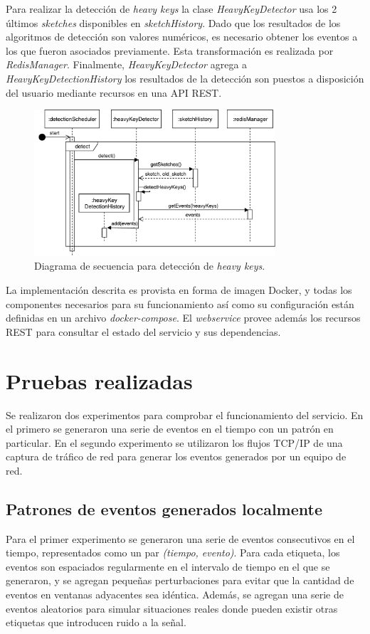 \documentclass[a4paper,10pt, oneside]{article}
\begin{document}
Para realizar la detección de \textit{heavy keys} la clase \textit{HeavyKeyDetector} usa los 2 últimos \textit{sketches} disponibles en \textit{sketchHistory}. Dado que los resultados de los algoritmos de detección son valores numéricos, es necesario obtener los eventos a los que fueron asociados previamente. Esta transformación es realizada por \textit{RedisManager}. Finalmente, \textit{HeavyKeyDetector} agrega a \textit{HeavyKeyDetectionHistory} los resultados de la detección son puestos a disposición del usuario mediante recursos en una API REST.

\begin{figure}[htbp]
	\centering
	\includegraphics[width=0.8\textwidth]{graph/SecDiag-detectionSchedulerDetect.pdf}
	\caption{Diagrama de secuencia para detección de \textit{heavy keys}.}
	\label{fig:SecDiagDetectionSchedulerDetect}
\end{figure}

La implementación descrita es provista en forma de imagen Docker, y todas los componentes necesarios para su funcionamiento así como su configuración están definidas en un archivo \textit{docker-compose}. El \textit{webservice} provee además los recursos REST para consultar el estado del servicio y sus dependencias.

\section{Pruebas realizadas}

Se realizaron dos experimentos para comprobar el funcionamiento del servicio. En el primero se generaron una serie de eventos en el tiempo con un patrón en particular. En el segundo experimento se utilizaron los flujos TCP/IP de una captura de tráfico de red para generar los eventos generados por un equipo de red. 

\subsection{Patrones de eventos generados localmente}
Para el primer experimento se generaron una serie de eventos consecutivos en el tiempo, representados como un par \textit{(tiempo, evento)}. Para cada etiqueta, los eventos son espaciados regularmente en el intervalo de tiempo en el que se generaron, y se agregan pequeñas perturbaciones para evitar que la cantidad de eventos en ventanas adyacentes sea idéntica. Además, se agregan una serie de eventos aleatorios para simular situaciones reales donde pueden existir otras etiquetas que introducen ruido a la señal.
\end{document}
